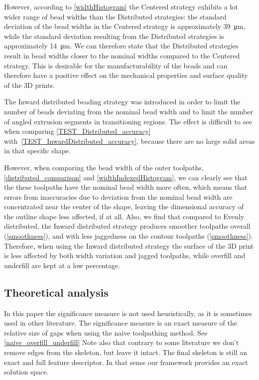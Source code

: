 However, according to \cref{widthHistogram} the Centered strategy exhibits a lot wider range of bead widths than the Distributed strategies:
the standard deviation of the bead widths in the Centered strategy is approximately \SI{39}{\micro\meter}, while the standard deviation resulting from the Distributed strategies is approximately \SI{14}{\micro\meter}.
We can therefore state that the Distributed strategies result in bead widths closer to the nominal widths compared to the Centered strategy.
This is desirable for the manufacturability of the beads and can therefore have a positive effect on the mechanical properties and surface quality of the 3D prints. 

The Inward distributed beading strategy was introduced in order to limit the number of beads deviating from the nominal bead width and to limit the number of angled extrusion segments in transitioning regions.
The effect is difficult to see when comparing \cref{TEST_Distributed_accuracy} with~\ref{TEST_InwardDistributed_accuracy}, because there are no large solid areas in that specific shape.

However, when comparing the bead width of the outer toolpaths, \cref{distributed_comparison} and  \cref{widthIndexedHistogram}, we can clearly see that the these toolpaths have the nominal bead width more often, which means that errors from inaccuracies due to deviation from the nominal bead width are concentrated near the center of the shape, leaving the dimensional accuracy of the outline shape less affected, if at all. 
Also, we find that compared to Evenly distributed, the Inward distributed strategy produces smoother toolpaths overall (\cref{smoothness}), and with less jaggedness on the contour toolpaths (\cref{smoothness}). 
Therefore, when using the Inward distributed strategy the surface of the 3D print is less affected by both width variation and jagged toolpaths, while overfill and underfill are kept at a low percentage.


\subsection{Theoretical analysis}
In this paper the significance measure is not used heuristically, as it is sometimes used in other literature.
The significance measure is an exact measure of the relative size of gaps when using the naive toolpathing method.
See \cref{naive_overfill_underfill}
Note also that contrary to some literature we don't remove edges from the skeleton, but leave it intact.
The final skeleton is still an exact and full feature descriptor.
In that sense our framework provides an exact solution space.

